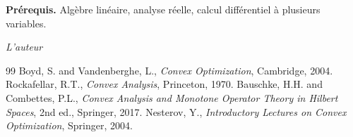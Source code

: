 \documentclass[12pt,a4paper,twoside]{book}
\theoremstyle{definition}
\theoremstyle{plain}
\theoremstyle{remark}
\begin{document}
\medskip

\noindent\textbf{Pr\'erequis.} Alg\`ebre lin\'eaire, analyse r\'eelle, calcul diff\'erentiel \`a plusieurs variables.

\vfill
\hfill\textit{L'auteur}


\mainmatter













\backmatter
\begin{thebibliography}{99}
 Boyd, S. and Vandenberghe, L., \emph{Convex Optimization}, Cambridge, 2004.
 Rockafellar, R.T., \emph{Convex Analysis}, Princeton, 1970.
 Bauschke, H.H. and Combettes, P.L., \emph{Convex Analysis and Monotone Operator Theory in Hilbert Spaces}, 2nd ed., Springer, 2017.
 Nesterov, Y., \emph{Introductory Lectures on Convex Optimization}, Springer, 2004.
\end{thebibliography}
\printindex
\end{document}
